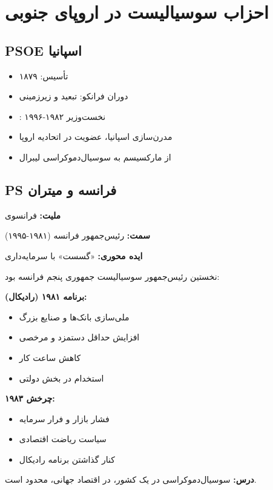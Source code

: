 \section{احزاب سوسیالیست در اروپای جنوبی}

\subsection{PSOE اسپانیا}

\begin{historybox}
\begin{itemize}[nosep]
    \item تأسیس: ۱۸۷۹
    \item دوران فرانکو: تبعید و زیرزمینی
    \item {}: نخست‌وزیر ۱۹۸۲-۱۹۹۶
    \item مدرن‌سازی اسپانیا، عضویت در اتحادیه اروپا
    \item از مارکسیسم به سوسیال‌دموکراسی لیبرال
\end{itemize}
\end{historybox}

\subsection{PS فرانسه و میتران}

\begin{personbox}

\textbf{ملیت:} فرانسوی

\textbf{سمت:} رئیس‌جمهور فرانسه (۱۹۸۱-۱۹۹۵)

\textbf{ایده محوری:} «گسست» با سرمایه‌داری

\mediumspace

 نخستین رئیس‌جمهور سوسیالیست جمهوری پنجم فرانسه بود:

\textbf{برنامه ۱۹۸۱ (رادیکال):}
\begin{itemize}[nosep]
    \item ملی‌سازی بانک‌ها و صنایع بزرگ
    \item افزایش حداقل دستمزد و مرخصی
    \item کاهش ساعت کار
    \item استخدام در بخش دولتی
\end{itemize}

\textbf{چرخش ۱۹۸۳:}
\begin{itemize}[nosep]
    \item فشار بازار و فرار سرمایه
    \item سیاست ریاضت اقتصادی
    \item کنار گذاشتن برنامه رادیکال
\end{itemize}

\mediumspace

\textbf{درس:} سوسیال‌دموکراسی در یک کشور، در اقتصاد جهانی، محدود است.
\end{personbox}

